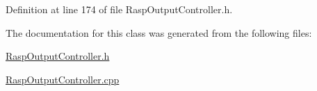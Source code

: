 Definition at line 174 of file Rasp\+Output\+Controller.\+h.



The documentation for this class was generated from the following files\+:\begin{DoxyCompactItemize}
\item 
\hyperlink{_rasp_output_controller_8h}{Rasp\+Output\+Controller.\+h}\item 
\hyperlink{_rasp_output_controller_8cpp}{Rasp\+Output\+Controller.\+cpp}\end{DoxyCompactItemize}

